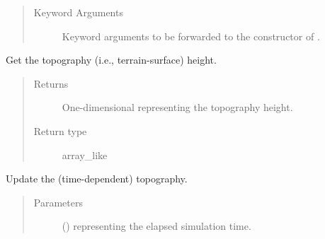 \documentclass[letterpaper,10pt,english]{sphinxmanual}
\begin{document}
\begin{fulllineitems}
\begin{fulllineitems}
\begin{quote}
\begin{description}
\begin{itemize}
\end{itemize}

\item[{Keyword Arguments}] \leavevmode
{} \textendash{} Keyword arguments to be forwarded to the constructor of {\hyperref[\detokenize{api:grids.topography.Topography1d}]{}}.

\end{description}\end{quote}

\end{fulllineitems}


\begin{fulllineitems}
\label{\detokenize{api:grids.grid_xz.GridXZ.topography_height}}
Get the topography (i.e., terrain-surface) height.
\begin{quote}\begin{description}
\item[{Returns}] \leavevmode
One-dimensional  representing the topography height.

\item[{Return type}] \leavevmode
array\_like

\end{description}\end{quote}

\end{fulllineitems}


\begin{fulllineitems}
\label{\detokenize{api:grids.grid_xz.GridXZ.update_topography}}
Update the (time-dependent) topography.
\begin{quote}\begin{description}
\item[{Parameters}] \leavevmode
{} () \textendash{}  representing the elapsed simulation time.

\end{description}\end{quote}

\end{fulllineitems}


\end{fulllineitems}
\end{document}
